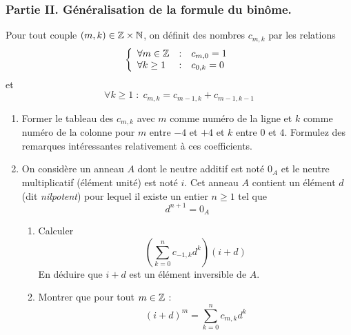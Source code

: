 \subsubsection*{Partie II. Généralisation de la formule du binôme.}
Pour tout couple $(m,k)\in \mathbb{Z}\times\mathbb{N}$, on définit des nombres $c_{m,k}$ par les relations
\begin{displaymath}
\left\lbrace 
\begin{array}{lll}
\forall m \in \mathbb{Z} & : & c_{m,0}=1 \\ 
\forall k \geq 1 & : & c_{0,k}=0
\end{array}
\right. 
\end{displaymath}
et
\[\forall k\geq1 \; : \; c_{m,k}=c_{m-1,k} + c_{m-1,k-1}\]
\begin{enumerate}
 \item Former le tableau des $c_{m,k}$ avec $m$ comme numéro de la ligne et $k$ comme numéro de la colonne pour $m$ entre $-4$ et $+4$ et $k$ entre $0$ et $4$. \newline
Formulez des remarques intéressantes relativement à ces coefficients.
\item On considère un anneau $A$ dont le neutre additif est noté $0_A$ et le neutre multiplicatif (élément unité) est noté $i$. Cet anneau $A$ contient un élément $d$ (dit \emph{nilpotent}) pour lequel il existe un entier $n\geq 1$ tel que 
\[d^{n+1} = 0_A\]
\begin{enumerate}
 \item Calculer
\[\left( \sum _{k=0}^{n}c_{-1,k}d^k \right) (i+d)\]
En déduire que $i+d$ est un élément inversible de $A$.
\item Montrer que pour tout $m\in \mathbb{Z}$ :
\[(i+d)^m = \sum _{k=0}^{n}c_{m,k}d^k\]
\end{enumerate}

\end{enumerate}

